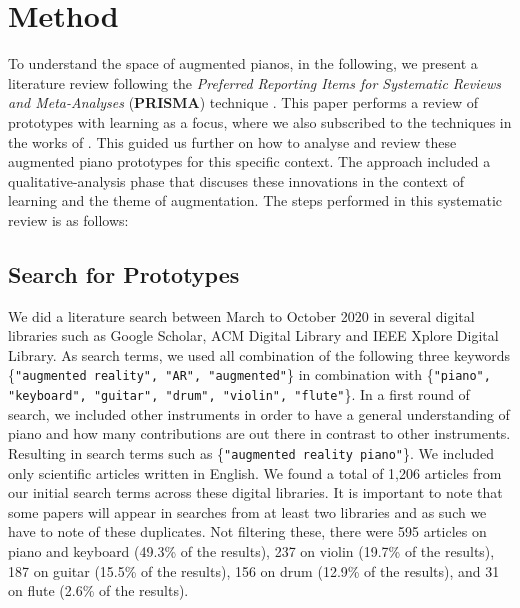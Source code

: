 \documentclass[sigconf, screen, review]{acmart}
\begin{document}
\section{Method}
To understand the space of augmented pianos, in the following, we present a literature review following the \textit{Preferred Reporting Items for Systematic Reviews and Meta-Analyses} (\textbf{PRISMA}) technique \cite{moher2009preferred}. This paper performs a review of prototypes with learning as a focus, where we also subscribed to the techniques in the works of \cite{santos2013augmented, schneegass2016mobile, kljun2015transference, blattgerste2019augmented, mcpherson2015buttons, delgado2011state}. This guided us further on how to analyse and review these augmented piano prototypes for this specific context. The approach included a qualitative-analysis phase that discuses these innovations in the context of learning and the theme of augmentation. The steps performed in this systematic review is as follows: 

\subsection{Search for Prototypes}
We did a literature search between March to October 2020 in several digital libraries such as Google Scholar, ACM Digital Library and IEEE Xplore Digital Library. As search terms, we used all combination of the following three keywords \{\texttt{"augmented reality", "AR", "augmented"}\} in combination with \{\texttt{"piano", "keyboard", "guitar", "drum", "violin", "flute"}\}. In a first round of search, we included other instruments in order to have a general understanding of piano and how many contributions are out there in contrast to other instruments. Resulting in search terms such as \{\texttt{"augmented reality piano"}\}. We included only scientific articles written in English. We found a total of 1,206 articles from our initial search terms across these digital libraries. It is important to note that some papers will appear in searches from at least two libraries and as such we have to note of these duplicates. Not filtering these, there were 595 articles on piano and keyboard (49.3\% of the results), 237 on violin (19.7\% of the results), 187 on guitar (15.5\% of the results), 156 on drum (12.9\% of the results), and 31 on flute (2.6\% of the results). 
\end{document}

